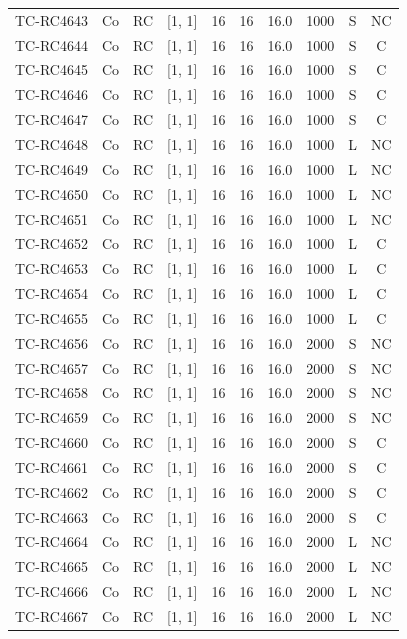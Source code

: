 \begin{longtable}{lccccccccc}
TC-RC4643 & Co & RC & [1, 1] & 16 & 16 & 16.0 & 1000 & S & NC \\
TC-RC4644 & Co & RC & [1, 1] & 16 & 16 & 16.0 & 1000 & S & C \\
TC-RC4645 & Co & RC & [1, 1] & 16 & 16 & 16.0 & 1000 & S & C \\
TC-RC4646 & Co & RC & [1, 1] & 16 & 16 & 16.0 & 1000 & S & C \\
TC-RC4647 & Co & RC & [1, 1] & 16 & 16 & 16.0 & 1000 & S & C \\
TC-RC4648 & Co & RC & [1, 1] & 16 & 16 & 16.0 & 1000 & L & NC \\
TC-RC4649 & Co & RC & [1, 1] & 16 & 16 & 16.0 & 1000 & L & NC \\
TC-RC4650 & Co & RC & [1, 1] & 16 & 16 & 16.0 & 1000 & L & NC \\
TC-RC4651 & Co & RC & [1, 1] & 16 & 16 & 16.0 & 1000 & L & NC \\
TC-RC4652 & Co & RC & [1, 1] & 16 & 16 & 16.0 & 1000 & L & C \\
TC-RC4653 & Co & RC & [1, 1] & 16 & 16 & 16.0 & 1000 & L & C \\
TC-RC4654 & Co & RC & [1, 1] & 16 & 16 & 16.0 & 1000 & L & C \\
TC-RC4655 & Co & RC & [1, 1] & 16 & 16 & 16.0 & 1000 & L & C \\
TC-RC4656 & Co & RC & [1, 1] & 16 & 16 & 16.0 & 2000 & S & NC \\
TC-RC4657 & Co & RC & [1, 1] & 16 & 16 & 16.0 & 2000 & S & NC \\
TC-RC4658 & Co & RC & [1, 1] & 16 & 16 & 16.0 & 2000 & S & NC \\
TC-RC4659 & Co & RC & [1, 1] & 16 & 16 & 16.0 & 2000 & S & NC \\
TC-RC4660 & Co & RC & [1, 1] & 16 & 16 & 16.0 & 2000 & S & C \\
TC-RC4661 & Co & RC & [1, 1] & 16 & 16 & 16.0 & 2000 & S & C \\
TC-RC4662 & Co & RC & [1, 1] & 16 & 16 & 16.0 & 2000 & S & C \\
TC-RC4663 & Co & RC & [1, 1] & 16 & 16 & 16.0 & 2000 & S & C \\
TC-RC4664 & Co & RC & [1, 1] & 16 & 16 & 16.0 & 2000 & L & NC \\
TC-RC4665 & Co & RC & [1, 1] & 16 & 16 & 16.0 & 2000 & L & NC \\
TC-RC4666 & Co & RC & [1, 1] & 16 & 16 & 16.0 & 2000 & L & NC \\
TC-RC4667 & Co & RC & [1, 1] & 16 & 16 & 16.0 & 2000 & L & NC \\

\end{longtable}
